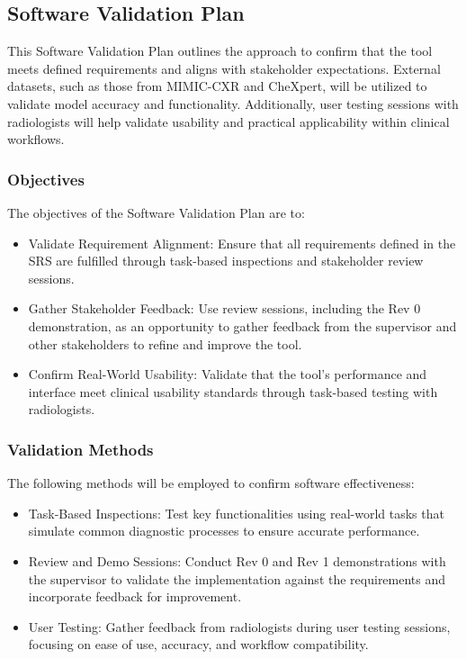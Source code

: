 \documentclass[12pt, titlepage]{article}
\begin{document}
\subsection{Software Validation Plan}
This Software Validation Plan outlines the approach to confirm that the tool meets defined requirements and aligns with stakeholder expectations. External datasets, such as those from MIMIC-CXR and CheXpert, will be utilized to validate model accuracy and functionality. Additionally, user testing sessions with radiologists will help validate usability and practical applicability within clinical workflows.

\subsubsection{Objectives}
The objectives of the Software Validation Plan are to:
\begin{itemize}
  \item Validate Requirement Alignment: Ensure that all requirements defined in the SRS are fulfilled through task-based inspections and stakeholder review sessions.
  \item Gather Stakeholder Feedback: Use review sessions, including the Rev 0 demonstration, as an opportunity to gather feedback from the supervisor and other stakeholders to refine and improve the tool.
  \item Confirm Real-World Usability: Validate that the tool’s performance and interface meet clinical usability standards through task-based testing with radiologists.
\end{itemize}

\subsubsection{Validation Methods}
The following methods will be employed to confirm software effectiveness:
\begin{itemize}
  \item Task-Based Inspections: Test key functionalities using real-world tasks that simulate common diagnostic processes to ensure accurate performance.
  \item Review and Demo Sessions: Conduct Rev 0 and Rev 1 demonstrations with the supervisor to validate the implementation against the requirements and incorporate feedback for improvement.
  \item User Testing: Gather feedback from radiologists during user testing sessions, focusing on ease of use, accuracy, and workflow compatibility.
\end{itemize}
\end{document}
